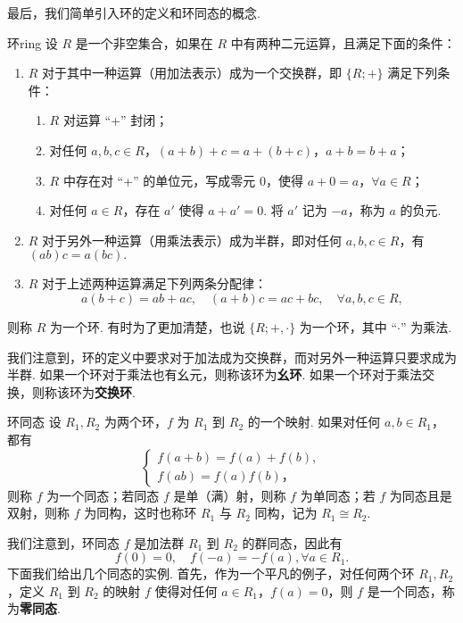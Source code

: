 \documentclass[12pt, a4paper,newtx]{ctexart}
\begin{document}
最后，我们简单引入环的定义和环同态的概念. 
\begin{definition}{环}{ring}\kaishu 
	设 $R$ 是一个非空集合，如果在 $R$ 中有两种二元运算，且满足下面的条件：
	\begin{enumerate}
		\item $R$ 对于其中一种运算（用加法表示）成为一个交换群，即 $\{R; +\}$ 满足下列条件：
		\begin{enumerate}
			\item $R$ 对运算 “+” 封闭；
			\item 对任何 $a, b, c \in R$，$(a+b)+c = a+(b+c)$，$a+b = b+a$；
			\item $R$ 中存在对 “+” 的单位元，写成零元 $0$，使得 $a+0 = a$，$\forall a \in R$；
			\item 对任何 $a \in R$，存在 $a'$ 使得 $a + a' = 0$. 将 $a'$ 记为 $-a$，称为 $a$ 的负元. 
		\end{enumerate}
		\item $R$ 对于另外一种运算（用乘法表示）成为半群，即对任何 $a, b, c \in R$，有$(ab)c = a(bc).$
		\item $R$ 对于上述两种运算满足下列两条分配律：
		\[
		a(b+c) = ab + ac, \quad (a+b)c = ac + bc, \quad \forall a, b, c \in R,
		\]
	\end{enumerate}
	则称 $R$ 为一个{\heiti 环}. 有时为了更加清楚，也说 $\{R; +, \cdot\}$ 为一个环，其中 “$\cdot$” 为乘法. 
\end{definition}
我们注意到，环的定义中要求对于加法成为交换群，而对另外一种运算只要求成为半群. 如果一个环对于乘法也有幺元，则称该环为\textbf{幺环}. 如果一个环对于乘法交换，则称该环为\textbf{交换环}. 
\begin{definition}{环同态}{}\kaishu 
	设 $R_1, R_2$ 为两个环，$f$ 为 $R_1$ 到 $R_2$ 的一个映射. 如果对任何 $a, b \in R_1$，都有\begin{equation}
		\begin{cases}
			f(a+b) = f(a) + f(b),\\f(ab) = f(a)f(b)，
		\end{cases}
	\end{equation}
	则称 $f$ 为一个{\heiti 同态}；若同态 $f$ 是单（满）射，则称 $f$ 为单同态；若 $f$ 为同态且是双射，则称 $f$ 为{\heiti 同构}，这时也称环 $R_1$ 与 $R_2$ 同构，记为 $R_1 \cong R_2$. 
\end{definition}
我们注意到，环同态 $f$ 是加法群 $R_1$ 到 $R_2$ 的群同态，因此有\begin{equation*}
	f(0) = 0,\quad f(-a) = -f(a), \forall a \in R_1.
\end{equation*}
下面我们给出几个同态的实例. 首先，作为一个平凡的例子，对任何两个环 $R_1, R_2$，定义 $R_1$ 到 $R_2$ 的映射 $f$ 使得对任何 $a \in R_1$，$f(a) = 0$，则 $f$ 是一个同态，称为\textbf{零同态}. 
\end{document}
